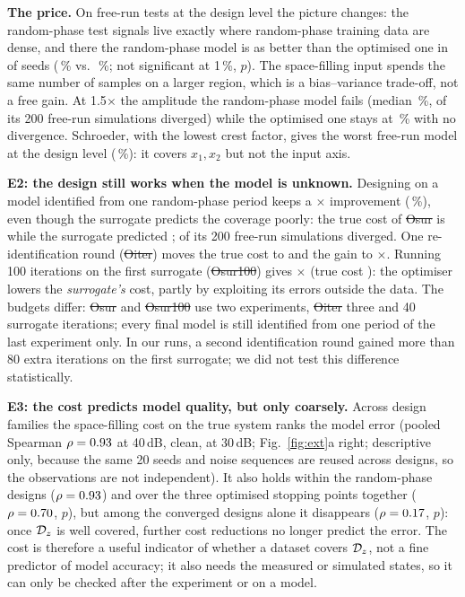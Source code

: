 \textbf{The price.} On free-run tests at the design level the picture changes: the random-phase test
signals live exactly where random-phase training data are dense, and there the random-phase model is as
better than the optimised one in \mWinRvsOfullsim{} of \mNExt{} seeds (\mXRfortyesimonesixty\,\% vs.\
\mXOfullfortyesimonesixty\,\%; not significant at 1\,\%, $p$\mPwOfullfortyesimonesixty). The space-filling input spends the same number of samples on a larger
region, which is a bias--variance trade-off, not a free gain. At 1.5$\times$ the amplitude the
random-phase model fails (median \mXRfortyesimtwoforty\,\%, \mXRfortydivTot{} of its 200 free-run
simulations diverged) while the optimised one stays at \mXOfullfortyesimtwoforty\,\% with no divergence.
Schroeder, with the lowest crest factor, gives the worst free-run model at the design level
(\mXSfortyesimonesixty\,\%): it covers $x_1,x_2$ but not the input axis.

\textbf{E2: the design still works when the model is unknown.} Designing on a model identified from one
random-phase period keeps a \mFOsurforty$\times$ improvement (\mXOsurfortyeuni\,\%), even though the
surrogate predicts the coverage poorly: the true cost of \st{Osur} is \mXOsurfortyCtrue{} while the
surrogate predicted \mChatOsur; \mXOsurfortydivTot{} of its 200 free-run simulations diverged. One
re-identification round (\st{Oiter}) moves the true cost to \mXOiterfortyCtrue{} and the gain to
\mFOiterforty$\times$. Running 100 iterations on the first surrogate (\st{Osur100}) gives
\mFOsurOneZeroZeroforty$\times$ (true cost \mXOsurOneZeroZerofortyCtrue): the optimiser lowers the
\emph{surrogate's} cost, partly by exploiting its errors outside the data. The budgets differ: \st{Osur} and
\st{Osur100} use two experiments, \st{Oiter} three and 40 surrogate iterations; every final model is still
identified from one period of the last experiment only. In our runs, a second identification round gained
more than 80 extra iterations on the first surrogate; we did not test this difference statistically.

\textbf{E3: the cost predicts model quality, but only coarsely.} Across design families the space-filling
cost on the true system ranks the model error (pooled Spearman $\rho=0.93$ at 40\,dB, \mRhoinf{} clean,
\mRhothirty{} at 30\,dB; Fig.~\ref{fig:ext}a right; descriptive only, because the same 20 seeds and noise sequences are reused across designs, so the
observations are not independent). It also holds within the random-phase designs ($\rho=0.93$) and over the
three optimised stopping points together ($\rho=0.70$, $p$\mRhoOptP), but among the converged designs
alone it disappears ($\rho=0.17$, $p$\mRhoInPOfull): once $\mathcal{D}_z$ is well covered, further cost
reductions no longer predict the error. The cost is therefore a useful indicator of whether a dataset covers
$\mathcal{D}_z$, not a fine predictor of model accuracy; it also needs the measured or simulated states, so it can
only be checked after the experiment or on a model.


